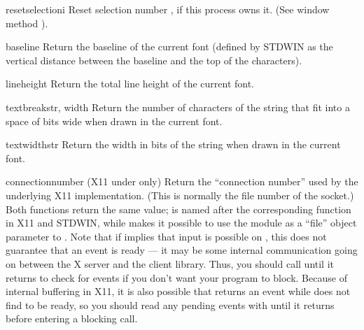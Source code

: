 \begin{funcdesc}{resetselection}{i}
Reset selection number , if this process owns it.  (See window
method ).
\end{funcdesc}

\begin{funcdesc}{baseline}{}
Return the baseline of the current font (defined by STDWIN as the
vertical distance between the baseline and the top of the
characters).
\end{funcdesc}

\begin{funcdesc}{lineheight}{}
Return the total line height of the current font.
\end{funcdesc}

\begin{funcdesc}{textbreak}{str, width}
Return the number of characters of the string that fit into a space of
bits wide when drawn in the current font.
\end{funcdesc}

\begin{funcdesc}{textwidth}{str}
Return the width in bits of the string when drawn in the current font.
\end{funcdesc}

\begin{funcdesc}{connectionnumber}{}
(X11 under \UNIX{} only) Return the ``connection number'' used by the
underlying X11 implementation.  (This is normally the file number of
the socket.)  Both functions return the same value;
 is named after the corresponding function in
X11 and STDWIN, while  makes it possible to use the
 module as a ``file'' object parameter to
.  Note that if  implies that
input is possible on , this does not guarantee that an
event is ready --- it may be some internal communication going on
between the X server and the client library.  Thus, you should call
 until it returns  to check for
events if you don't want your program to block.  Because of internal
buffering in X11, it is also possible that 
returns an event while  does not find  to
be ready, so you should read any pending events with
 until it returns  before entering
a blocking  call.
\end{funcdesc}

